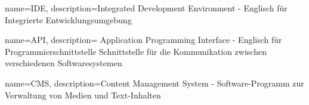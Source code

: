 
{
    name={IDE},
    description={Integrated Development Environment - Englisch für \glqq Integrierte Entwicklungsumgebung\grqq}
}

{
    name={API},
    description={
        Application Programming Interface - Englisch für \glqq Programmierschnittstelle\grqq{,} Schnittstelle
        für die Kommunikation zwischen verschiedenen Softwaresystemen
    }
}

{
    name={CMS},
    description={Content Management System - Software-Programm zur Verwaltung von Medien und Text-Inhalten}
}

